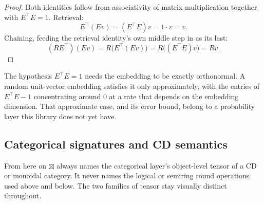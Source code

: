 \begin{proof}
\leanok
Both identities follow from associativity of matrix multiplication
together with $E^\top E = 1$. Retrieval:
\[
  E^\top(Ev) = (E^\top E)v = 1 \cdot v = v.
\]
Chaining, feeding the retrieval identity's own middle step in as its
last:
\[
  (RE^\top)(Ev) = R\bigl(E^\top(Ev)\bigr) = R\bigl((E^\top E)v\bigr) = Rv.
\]
\end{proof}

The hypothesis $E^\top E = 1$ needs the embedding to be exactly
orthonormal. A random unit-vector embedding satisfies it only
approximately, with the entries of $E^\top E - 1$ concentrating around
$0$ at a rate that depends on the embedding dimension. That
approximate case, and its error bound, belong to a probability layer
this library does not yet have.

\subsection{Categorical signatures and CD semantics}  %
\label{sec:categorical-signatures}

From here on $\boxtimes$ always names the
categorical layer's object-level tensor of a CD or monoidal category.
It never names the logical or semiring round operations used above and
below. The two families of tensor stay visually distinct throughout.

